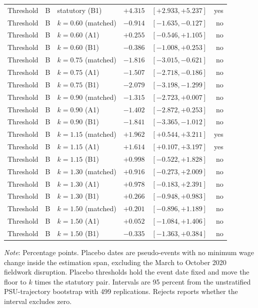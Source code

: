 \begin{table}[H]
\begin{tabular}{lllrrr}
Threshold & B & statutory (B1) & $+4.315$ & $[+2.933, +5.237]$ & yes \\
Threshold & B & $k=0.60$ (matched) & $-0.914$ & $[-1.635, -0.127]$ & no \\
Threshold & B & $k=0.60$ (A1) & $+0.255$ & $[-0.546, +1.105]$ & no \\
Threshold & B & $k=0.60$ (B1) & $-0.386$ & $[-1.008, +0.253]$ & no \\
Threshold & B & $k=0.75$ (matched) & $-1.816$ & $[-3.015, -0.621]$ & no \\
Threshold & B & $k=0.75$ (A1) & $-1.507$ & $[-2.718, -0.186]$ & no \\
Threshold & B & $k=0.75$ (B1) & $-2.079$ & $[-3.198, -1.299]$ & no \\
Threshold & B & $k=0.90$ (matched) & $-1.315$ & $[-2.723, +0.007]$ & no \\
Threshold & B & $k=0.90$ (A1) & $-1.402$ & $[-2.872, +0.253]$ & no \\
Threshold & B & $k=0.90$ (B1) & $-1.841$ & $[-3.365, -1.012]$ & no \\
Threshold & B & $k=1.15$ (matched) & $+1.962$ & $[+0.544, +3.211]$ & yes \\
Threshold & B & $k=1.15$ (A1) & $+1.614$ & $[+0.107, +3.197]$ & yes \\
Threshold & B & $k=1.15$ (B1) & $+0.998$ & $[-0.522, +1.828]$ & no \\
Threshold & B & $k=1.30$ (matched) & $+0.916$ & $[-0.273, +2.009]$ & no \\
Threshold & B & $k=1.30$ (A1) & $+0.978$ & $[-0.183, +2.391]$ & no \\
Threshold & B & $k=1.30$ (B1) & $+0.266$ & $[-0.948, +0.983]$ & no \\
Threshold & B & $k=1.50$ (matched) & $+0.201$ & $[-0.896, +1.189]$ & no \\
Threshold & B & $k=1.50$ (A1) & $+0.052$ & $[-1.084, +1.406]$ & no \\
Threshold & B & $k=1.50$ (B1) & $-0.335$ & $[-1.363, +0.384]$ & no \\
\bottomrule
\end{tabular}
\begin{minipage}{0.95\textwidth}\small
\textit{Note}: Percentage points. Placebo dates are pseudo-events with no minimum wage change inside the estimation span, excluding the March to October 2020 fieldwork disruption. Placebo thresholds hold the event date fixed and move the floor to $k$ times the statutory pair. Intervals are 95 percent from the unstratified PSU-trajectory bootstrap with 499 replications. Rejects reports whether the interval excludes zero.
\end{minipage}
\end{table}